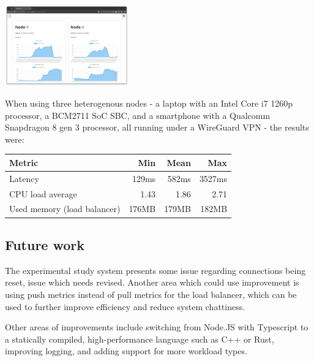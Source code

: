 \documentclass[conference]{IEEEtran}
\begin{document}
    \begin{center}
        \vspace{1em}
        \includegraphics[width=0.4\textwidth]{homogenous-load-balancing-example.png}
         \label{homogenous-load-balancing-example}
        \vspace{1em}
    \end{center}

    When using three heterogenous nodes - a laptop with an Intel Core i7 1260p processor, a BCM2711 SoC SBC, and a smartphone
with a Qualcomm Snapdragon 8 gen 3 processor, all running under a WireGuard VPN - the results were:

    \begin{center}
        \centering
        \begin{tabular}{l|r|r|r}
            Metric & Min & Mean & Max \\
            \hline
            Latency & 129ms & 582ms & 3527ms \\
            \hline
            CPU load average & 1.43 & 1.86 & 2.71 \\
            \hline
            Used memory (load balancer) & 176MB & 179MB & 182MB \\
        \end{tabular}
         \label{heterogenous-nodes-metrics}
    \end{center}

\subsection{Future work}
    The experimental study system presents some issue regarding connections being reset, issue which needs revised. Another
area which could use improvement is using push metrics instead of pull metrics for the load balancer, which can be used to
further improve efficiency and reduce system chattiness.

    Other areas of improvements include switching from Node.JS with Typescript to a statically compiled, high-performance
language such as C++ or Rust, improving logging, and adding support for more workload types.
\end{document}
